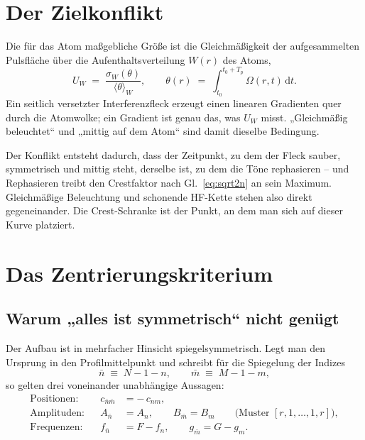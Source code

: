 \documentclass[11pt,a4paper]{article}
\newcommand{\Uw}{\ensuremath{U_W}}
\begin{document}
\section{Der Zielkonflikt}

Die für das Atom maßgebliche Größe ist die Gleichmäßigkeit der
aufgesammelten Pulsfläche über die Aufenthaltsverteilung $W(r)$ des Atoms,
\begin{equation}
  \Uw \;=\; \frac{\sigma_W(\theta)}{\langle\theta\rangle_W},
  \qquad
  \theta(r) \;=\; \int_{t_0}^{t_0+T_p} \Omega(r,t)\,\mathrm{d}t .
  \label{eq:uw}
\end{equation}
Ein seitlich versetzter Interferenzfleck erzeugt einen linearen Gradienten
quer durch die Atomwolke; ein Gradient ist genau das, was $\Uw$ misst.
„Gleichmäßig beleuchtet`` und „mittig auf dem Atom`` sind damit dieselbe
Bedingung.

Der Konflikt entsteht dadurch, dass der Zeitpunkt, zu dem der Fleck sauber,
symmetrisch und mittig steht, derselbe ist, zu dem die Töne rephasieren --
und Rephasieren treibt den Crestfaktor nach Gl.~\eqref{eq:sqrt2n} an sein
Maximum. Gleichmäßige Beleuchtung und schonende HF-Kette stehen also direkt
gegeneinander. Die Crest-Schranke ist der Punkt, an dem man sich auf dieser
Kurve platziert.

\section{Das Zentrierungskriterium}\label{sec:zentrierung}

\subsection{Warum „alles ist symmetrisch`` nicht genügt}

Der Aufbau ist in mehrfacher Hinsicht spiegelsymmetrisch. Legt man den
Ursprung in den Profilmittelpunkt und schreibt für die Spiegelung der Indizes
\begin{equation}
  \bar n \;\equiv\; N-1-n , \qquad \bar m \;\equiv\; M-1-m ,
  \label{eq:barindex}
\end{equation}
so gelten drei voneinander unabhängige Aussagen:
\begin{align}
  \text{Positionen:}&&  c_{\bar n\bar m} &= -\,c_{nm} , \label{eq:symgeo}\\
  \text{Amplituden:}&&  A_{\bar n} &= A_n , \qquad B_{\bar m} = B_m
     \qquad\text{(Muster } [r,1,\dots,1,r]\text{)} , \label{eq:symamp}\\
  \text{Frequenzen:}&&  f_{\bar n} &= F - f_n , \qquad g_{\bar m} = G - g_m .
     \label{eq:symfreq}
\end{align}
\end{document}
